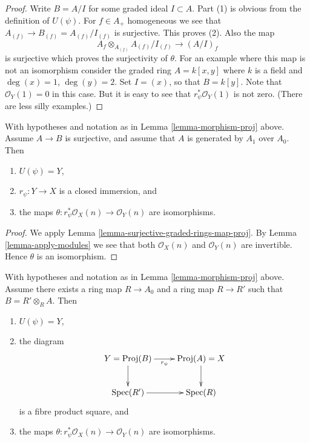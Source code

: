\begin{proof}
Write $B = A/I$ for some graded ideal $I \subset A$.
Part (1) is obvious from the definition of $U(\psi)$.
For $f \in A_{+}$ homogeneous we see that
$A_{(f)} \to B_{(f)} = A_{(f)}/I_{(f)}$ is surjective.
This proves (2).
Also the map
$$
A_f \otimes_{A_{(f)}} A_{(f)}/I_{(f)} \to (A/I)_f
$$
is surjective which proves the surjectivity of $\theta$.
For an example where this map is not an isomorphism
consider the graded ring $A = k[x, y]$ where $k$ is a field
and $\deg(x) = 1$, $\deg(y) = 2$. Set $I = (x)$, so that
$B = k[y]$. Note that $\mathcal{O}_Y(1) = 0$ in this case.
But it is easy to see that $r_\psi^*\mathcal{O}_Y(1)$
is not zero. (There are less silly examples.)
\end{proof}

\begin{lemma}
\label{lemma-surjective-graded-rings-generated-degree-1-map-proj}
With hypotheses and notation as in Lemma \ref{lemma-morphism-proj} above.
Assume $A \to B$ is surjective, and assume that $A$ is generated
by $A_1$ over $A_0$. Then
\begin{enumerate}
\item $U(\psi) = Y$,
\item $r_\psi : Y \to X$ is a closed immersion, and
\item the maps $\theta : r_\psi^*\mathcal{O}_X(n) \to \mathcal{O}_Y(n)$
are isomorphisms.
\end{enumerate}
\end{lemma}

\begin{proof}
We apply Lemma \ref{lemma-surjective-graded-rings-map-proj}.
By Lemma \ref{lemma-apply-modules} we see that both
$\mathcal{O}_X(n)$ and $\mathcal{O}_Y(n)$
are invertible. Hence $\theta$ is an isomorphism.
\end{proof}

\begin{lemma}
\label{lemma-base-change-map-proj}
With hypotheses and notation as in Lemma \ref{lemma-morphism-proj} above.
Assume there exists a ring map $R \to A_0$ and a ring map
$R \to R'$ such that $B = R' \otimes_R A$. Then
\begin{enumerate}
\item $U(\psi) = Y$,
\item the diagram
$$
\xymatrix{
Y = \text{Proj}(B) \ar[r]_{r_\psi} \ar[d] &
\text{Proj}(A) = X \ar[d] \\
\text{Spec}(R') \ar[r] &
\text{Spec}(R)
}
$$
is a fibre product square, and
\item the maps $\theta : r_\psi^*\mathcal{O}_X(n) \to \mathcal{O}_Y(n)$
are isomorphisms.
\end{enumerate}
\end{lemma}

